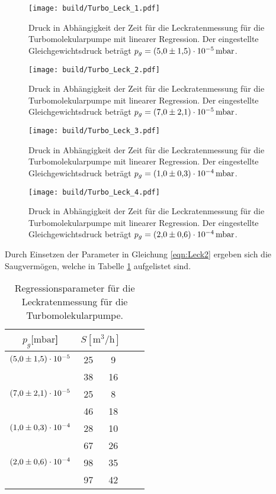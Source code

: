\begin{figure}[H]
    \centering
    \texttt{[image: build/Turbo\_Leck\_1.pdf]}
    \caption{Druck in Abhängigkeit der Zeit für die Leckratenmessung für die Turbomolekularpumpe mit linearer Regression. Der eingestellte Gleichgewichtsdruck beträgt $p_g=\SI{5 \pm 1.5 e-5}{\milli\bar}$.}
    \label{fig:turbo_leck1}
\end{figure}
\noindent
\begin{figure}[H]
    \centering
    \texttt{[image: build/Turbo\_Leck\_2.pdf]}
    \caption{Druck in Abhängigkeit der Zeit für die Leckratenmessung für die Turbomolekularpumpe mit linearer Regression. Der eingestellte Gleichgewichtsdruck beträgt $p_g=\SI{7 \pm 2.1 e-5}{\milli\bar}$.}
    \label{fig:turbo_leck2}
\end{figure}
\noindent
\begin{figure}[H]
    \centering
    \texttt{[image: build/Turbo\_Leck\_3.pdf]}
    \caption{Druck in Abhängigkeit der Zeit für die Leckratenmessung für die Turbomolekularpumpe mit linearer Regression. Der eingestellte Gleichgewichtsdruck beträgt $p_g=\SI{1 \pm 0.3 e-4}{\milli\bar}$.}
    \label{fig:turbo_leck3}
\end{figure}
\noindent
\begin{figure}[H]
    \centering
    \texttt{[image: build/Turbo\_Leck\_4.pdf]}
    \caption{Druck in Abhängigkeit der Zeit für die Leckratenmessung für die Turbomolekularpumpe mit linearer Regression. Der eingestellte Gleichgewichtsdruck beträgt $p_g=\SI{2 \pm 0.6 e-4}{\milli\bar}$.}
    \label{fig:turbo_leck4}
\end{figure}
\noindent
Durch Einsetzen der Parameter in Gleichung \ref{eqn:Leck2} ergeben sich die Saugvermögen, welche in 
Tabelle \ref{tab:Saug_Turbo_Leck} aufgelistet sind.
\begin{table}[H]
  \centering
    \caption{Regressionsparameter für die Leckratenmessung für die Turbomolekularpumpe.}
    \label{tab:Saug_Turbo_Leck}
    \begin{tabular}{c c @{${}\pm{}$} c c @{${}\pm{}$} c}
      \toprule
      {$p_g [\si{\milli\bar}$]} & \multicolumn{2}{c}{$S [\si{\cubic\metre\per\hour}]$} \\
      \midrule
      $\num{5.0 \pm 1.5 e-5}$  & 25 & 9 \\
                               & 38 & 16\\
      \midrule
      $\num{7.0 \pm 2.1 e-5}$  & 25 & 8 \\
                               & 46 & 18\\
      \midrule
      $\num{1.0 \pm 0.3 e-4}$  & 28 & 10\\
                               & 67 & 26\\
      \midrule
      $\num{2.0 \pm 0.6 e-4}$  & 98 & 35\\
                               & 97 & 42\\
      \bottomrule
    \end{tabular}
\end{table}